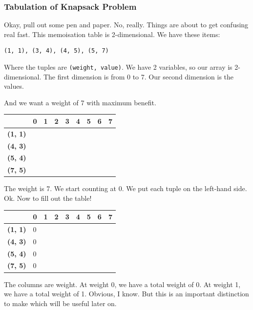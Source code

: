 \documentclass{article}
\newcommand{\code}[1]{\texttt{#1}}
\begin{document}
\newpage
\subsubsection{Tabulation of Knapsack Problem}
Okay, pull out some pen and paper. No, really. Things are about to get confusing real fast. This memoisation table is 2-dimensional. We have these items:
\begin{verbatim}
(1, 1), (3, 4), (4, 5), (5, 7)
\end{verbatim}
Where the tuples are \code{(weight, value)}.
We have 2 variables, so our array is 2-dimensional. The first dimension is from 0 to 7. Our second dimension is the values. 

And we want a weight of 7 with maximum benefit.
\begin{center}
\begin{tabular}{|l|l|l|l|l|l|l|l|l|}
\hline
                & \textbf{0} & \textbf{1} & \textbf{2} & \textbf{3} & \textbf{4} & \textbf{5} & \textbf{6} & \textbf{7} \\ \hline
\textbf{(1, 1)} &            &            &            &            &            &            &            &            \\ \hline
\textbf{(4, 3)} &            &            &            &            &            &            &            &            \\ \hline
\textbf{(5, 4)} &            &            &            &            &            &            &            &            \\ \hline
\textbf{(7, 5)} &            &            &            &            &            &            &            &            \\ \hline
\end{tabular}
\end{center}
The weight is 7. We start counting at 0. We put each tuple on the left-hand side. Ok. Now to fill out the table!
\begin{center}
\begin{tabular}{|l|l|l|l|l|l|l|l|l|}
\hline
                & \textbf{0} & \textbf{1} & \textbf{2} & \textbf{3} & \textbf{4} & \textbf{5} & \textbf{6} & \textbf{7} \\ \hline
\textbf{(1, 1)} & 0          &            &            &            &            &            &            &            \\ \hline
\textbf{(4, 3)} & 0          &            &            &            &            &            &            &            \\ \hline
\textbf{(5, 4)} & 0          &            &            &            &            &            &            &            \\ \hline
\textbf{(7, 5)} & 0          &            &            &            &            &            &            &            \\ \hline
\end{tabular}
\end{center}
The columns are weight. At weight 0, we have a total weight of 0. At weight 1, we have a total weight of 1. Obvious, I know. But this is an important distinction to make which will be useful later on.
\end{document}
